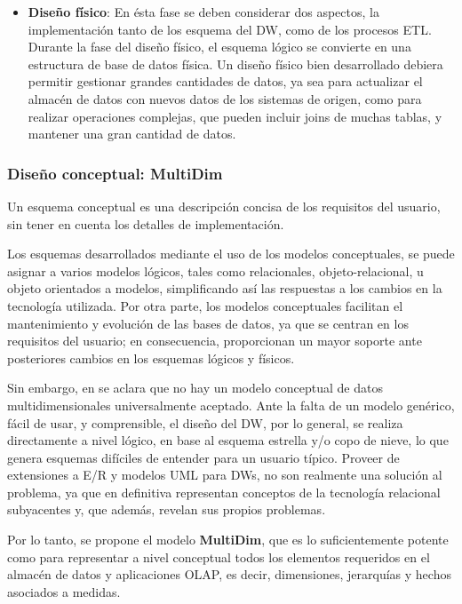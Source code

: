 \documentclass[a4paper,11pt]{article}
\begin{document}
\begin{itemize}
      \item \textbf{Diseño físico}:
      En ésta fase se deben considerar dos aspectos, la implementación tanto de los esquema del DW, como de los procesos ETL.
      Durante la fase del diseño físico, el esquema lógico se convierte en una estructura de base de datos física.
      Un diseño físico bien desarrollado debiera permitir gestionar grandes cantidades de datos, ya sea para actualizar el almacén de datos con nuevos datos de los
      sistemas de origen, como para realizar operaciones complejas, que pueden incluir joins de muchas tablas, y mantener una gran cantidad de datos.
      \end{itemize}      
      
      \subsubsection{Diseño conceptual: MultiDim}
      
      Un esquema conceptual es una descripción concisa de los requisitos del usuario, sin tener en cuenta los detalles de implementación.
      
      Los esquemas desarrollados mediante el uso de los modelos conceptuales, se puede asignar a varios modelos lógicos, tales como relacionales, objeto-relacional,
      u objeto orientados a modelos, simplificando así las respuestas a los cambios en la tecnología utilizada.
      Por otra parte, los modelos conceptuales facilitan el mantenimiento y evolución de las bases de datos, ya que se centran en los requisitos del usuario;
      en consecuencia, proporcionan un mayor soporte ante posteriores cambios en los esquemas lógicos y físicos.
      
      Sin embargo, en \cite{VaismanZimanyi14} se aclara que no hay un modelo conceptual de datos multidimensionales universalmente aceptado.
      Ante la falta de un modelo genérico, fácil de usar, y comprensible, el diseño del DW, por lo general, se realiza directamente a nivel lógico, en base
      al esquema estrella y/o copo de nieve, lo que genera esquemas difíciles de entender para un usuario típico.
      Proveer de extensiones a E/R y modelos UML para DWs, no son realmente una solución al problema, ya que en definitiva representan
      conceptos de la tecnología relacional subyacentes y, que además, revelan sus propios problemas.
      
      Por lo tanto, se propone el modelo \textbf{MultiDim}, que es lo suficientemente potente como para representar a nivel conceptual
      todos los elementos requeridos en el almacén de datos y aplicaciones OLAP, es decir, dimensiones, jerarquías y hechos asociados a medidas.
      
\end{document}
